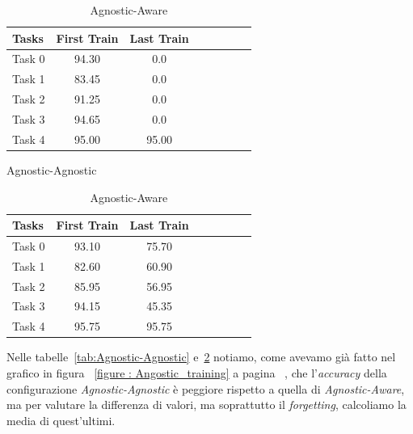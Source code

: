 \begin{table}[!htb]
\begin{minipage}{.5\linewidth}
    \centering

    \label{tab:Agnostic-Agnostic }

    \medskip

\begin{tabular}{l*{6}{c}r}
Tasks   & First Train & Last Train\\
\hline
   Task 0      &     94.30      &      0.0\\
   Task 1      &     83.45      &      0.0\\
   Task 2      &     91.25      &      0.0\\
   Task 3      &     94.65      &      0.0\\
   Task 4      &     95.00      &      95.00\\
\end{tabular}
\caption{Agnostic-Agnostic}
\label{tab:Agnostic-Agnostic}
\end{minipage}\hfill
\begin{minipage}{.5\linewidth}
    \centering

    \label{tab:Agnostic-Aware}

    \medskip

\begin{tabular}{l*{6}{c}r}
Tasks   & First Train  & Last Train\\
\hline
   Task 0      &     93.10      &      75.70\\
   Task 1      &     82.60      &      60.90\\
   Task 2      &     85.95      &      56.95\\
   Task 3      &     94.15      &      45.35\\
   Task 4      &     95.75      &      95.75\\
\end{tabular}
\caption{Agnostic-Aware}
\label{tab:Agnostic-Aware}
\end{minipage}
\end{table}
\newline
Nelle tabelle~\ref{tab:Agnostic-Agnostic} e~\ref{tab:Agnostic-Aware} notiamo, come avevamo già fatto nel grafico in figura ~\ref{figure : Angostic_training} a pagina ~\pageref{figure : Angostic_training}, che l'\textit{accuracy} della configurazione \textit{Agnostic-Agnostic} è peggiore rispetto a quella di \textit{Agnostic-Aware}, ma per valutare la differenza di valori, ma soprattutto il \textit{forgetting}, calcoliamo la media di quest'ultimi.
